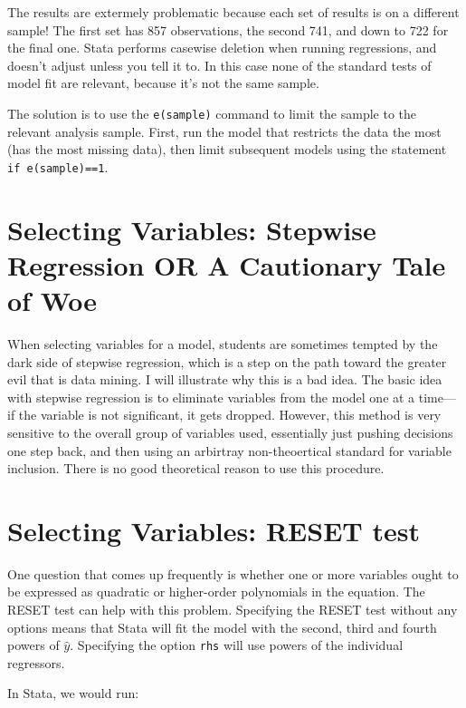 \documentclass[12pt]{article}
\begin{document}
The results are extermely problematic because each set of results is
on a different sample! The first set has 857 observations, the second
741, and down to 722 for the final one. Stata performs casewise
deletion when running regressions, and doesn't adjust unless you tell
it to. In this case none of the standard tests of model fit are
relevant, because it's not the same sample. 

The solution is to use the \texttt{e(sample)} command to limit the
sample to the relevant analysis sample. First, run the model that
restricts the data the most (has the most missing data), then limit
subsequent models using the statement \texttt{if e(sample)==1}.


\section{Selecting Variables: Stepwise Regression OR A Cautionary Tale of Woe}
\label{sec:select-vari-stepw}

When selecting variables for a model, students are sometimes tempted
by the dark side of stepwise regression, which is a step on the path
toward the greater evil that is data mining. I will illustrate why
this is a bad idea. The basic idea with stepwise regression is to
eliminate variables from the model one at a time---if the variable is
not significant, it gets dropped. However, this method is very
sensitive to the overall group of variables used, essentially just
pushing decisions one step back, and then using an arbirtray
non-theoertical standard for variable inclusion. There is no good theoretical
reason to use this procedure. 

\section{Selecting Variables: RESET  test}
\label{sec:select-vari-reset}

One question that comes up frequently is whether one or more variables
ought to be expressed as quadratic or higher-order polynomials in the
equation. The RESET test can help with this problem. Specifying the
RESET test without any options means that Stata will fit the model
with the second, third and fourth powers of $\hat{y}$. Specifying the
option \texttt{rhs} will use powers of the individual regressors.

In Stata, we would run:
\end{document}
